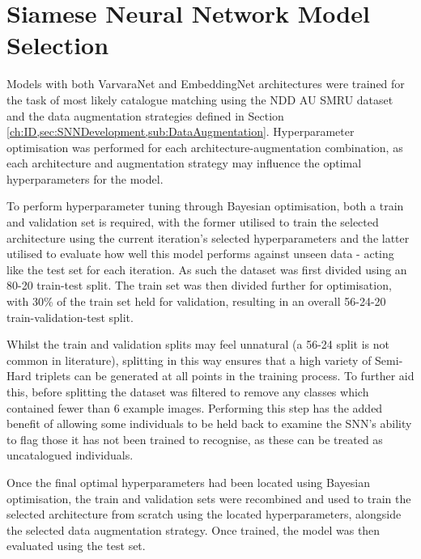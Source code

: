 \section{Siamese Neural Network Model Selection}\label{ch:ID,sec:ModelSelection}

Models with both VarvaraNet and EmbeddingNet architectures were trained for the task of most likely catalogue matching using the NDD AU SMRU dataset and the data augmentation strategies defined in Section \ref{ch:ID,sec:SNNDevelopment,sub:DataAugmentation}. Hyperparameter optimisation was performed for each architecture-augmentation combination, as each architecture and augmentation strategy may influence the optimal hyperparameters for the model.

To perform hyperparameter tuning through Bayesian optimisation, both a train and validation set is required, with the former utilised to train the selected architecture using the current iteration's selected hyperparameters and the latter utilised to evaluate how well this model performs against unseen data - acting like the test set for each iteration. As such the dataset was first divided using an 80-20 train-test split. The train set was then divided further for optimisation, with 30\% of the train set held for validation, resulting in an overall 56-24-20 train-validation-test split.

Whilst the train and validation splits may feel unnatural (a 56-24 split is not common in literature), splitting in this way ensures that a high variety of Semi-Hard triplets can be generated at all points in the training process. To further aid this, before splitting the dataset was filtered to remove any classes which contained fewer than 6 example images. Performing this step has the added benefit of allowing some individuals to be held back to examine the SNN's ability to flag those it has not been trained to recognise, as these can be treated as uncatalogued individuals. 

Once the final optimal hyperparameters had been located using Bayesian optimisation, the train and validation sets were recombined and used to train the selected architecture from scratch using the located hyperparameters, alongside the selected data augmentation strategy. Once trained, the model was then evaluated using the test set. 

